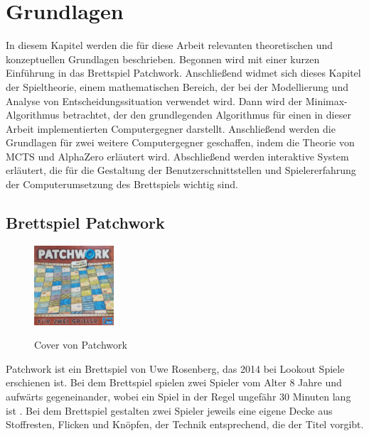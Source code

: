 \chapter{Grundlagen}
\label{chapter:grundlagen}

In diesem Kapitel werden die für diese Arbeit relevanten theoretischen und konzeptuellen Grundlagen beschrieben. Begonnen wird mit einer kurzen Einführung in das Brettspiel Patchwork. Anschließend widmet sich dieses Kapitel der Spieltheorie, einem mathematischen Bereich, der bei der Modellierung und Analyse von Entscheidungssituation verwendet wird. Dann wird der Minimax-Algorithmus betrachtet, der den grundlegenden Algorithmus für einen in dieser Arbeit implementierten Computergegner darstellt. Anschließend werden die Grundlagen für zwei weitere Computergegner geschaffen, indem die Theorie von \acl{MCTS} und AlphaZero erläutert wird. Abschließend werden interaktive System erläutert, die für die Gestaltung der Benutzerschnittstellen und Spielererfahrung der Computerumsetzung des Brettspiels wichtig sind.

\section{Brettspiel Patchwork}
\label{chapter:brettspiel-patchwork}

\begin{figure}
    \centering
    \vspace*{-1.3cm}
    \vspace*{-0.75cm}
    \includegraphics[width=0.265\textwidth]{res/pictures/assets/patchwork-cover.png}
    \caption[Cover von Patchwork]{\unskip}
    Cover von Patchwork
    \label{fig:patchwork-cover}
    \vspace*{-0.75cm}
\end{figure}

Patchwork ist ein Brettspiel von Uwe Rosenberg, das 2014 bei Lookout Spiele erschienen ist. Bei dem Brettspiel spielen zwei Spieler vom Alter 8 Jahre und aufwärts gegeneinander, wobei ein Spiel in der Regel ungefähr 30 Minuten lang ist \cite{LookoutSpielePatchwork}. Bei dem Brettspiel gestalten zwei Spieler jeweils eine eigene Decke aus Stoffresten, Flicken und Knöpfen, der Technik entsprechend, die der Titel vorgibt. \cite{SpielDesJahresPatchwork}

